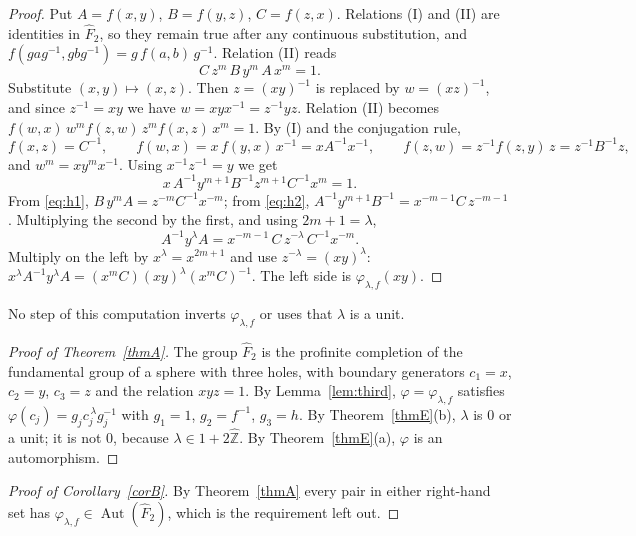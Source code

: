 \documentclass[11pt]{amsart}
\theoremstyle{definition}
\theoremstyle{remark}
\newcommand{\Zh}{\widehat{\mathbb Z}}
\newcommand{\Fh}{\widehat F}
\newcommand{\Aut}{\operatorname{Aut}}
\newcommand{\ph}{\varphi}
\begin{document}
\begin{proof}
Put $A=f(x,y)$, $B=f(y,z)$, $C=f(z,x)$. Relations (I) and (II) are identities in $\Fh_2$, so they remain true after any continuous substitution, and $f(gag^{-1},gbg^{-1})=g\,f(a,b)\,g^{-1}$. Relation (II) reads
\begin{equation}\label{eq:h1}
 C\,z^{m}\,B\,y^{m}\,A\,x^{m}=1 .
\end{equation}
Substitute $(x,y)\mapsto(x,z)$. Then $z=(xy)^{-1}$ is replaced by $w=(xz)^{-1}$, and since $z^{-1}=xy$ we have $w=xyx^{-1}=z^{-1}yz$. Relation (II) becomes $f(w,x)\,w^{m}f(z,w)\,z^{m}f(x,z)\,x^{m}=1$. By (I) and the conjugation rule,
\[
 f(x,z)=C^{-1},\qquad f(w,x)=x\,f(y,x)\,x^{-1}=xA^{-1}x^{-1},\qquad f(z,w)=z^{-1}f(z,y)\,z=z^{-1}B^{-1}z ,
\]
and $w^{m}=xy^{m}x^{-1}$. Using $x^{-1}z^{-1}=y$ we get
\begin{equation}\label{eq:h2}
 x\,A^{-1}y^{m+1}B^{-1}z^{m+1}C^{-1}x^{m}=1 .
\end{equation}
From \eqref{eq:h1}, $B\,y^{m}A=z^{-m}C^{-1}x^{-m}$; from \eqref{eq:h2}, $A^{-1}y^{m+1}B^{-1}=x^{-m-1}C\,z^{-m-1}$. Multiplying the second by the first, and using $2m+1=\lambda$,
\[
 A^{-1}y^{\lambda}A=x^{-m-1}\,C\,z^{-\lambda}\,C^{-1}x^{-m}.
\]
Multiply on the left by $x^{\lambda}=x^{2m+1}$ and use $z^{-\lambda}=(xy)^{\lambda}$:
$x^{\lambda}A^{-1}y^{\lambda}A=(x^{m}C)(xy)^{\lambda}(x^{m}C)^{-1}$. The left side is $\ph_{\lambda,f}(xy)$.
\end{proof}

No step of this computation inverts $\ph_{\lambda,f}$ or uses that $\lambda$ is a unit.

\begin{proof}[Proof of Theorem~\ref{thmA}]
The group $\Fh_2$ is the profinite completion of the fundamental group of a sphere with three holes, with boundary generators $c_1=x$, $c_2=y$, $c_3=z$ and the relation $xyz=1$. By Lemma~\ref{lem:third}, $\ph=\ph_{\lambda,f}$ satisfies $\ph(c_j)=g_jc_j^{\,\lambda}g_j^{-1}$ with $g_1=1$, $g_2=f^{-1}$, $g_3=h$. By Theorem~\ref{thmE}(b), $\lambda$ is $0$ or a unit; it is not $0$, because $\lambda\in1+2\Zh$. By Theorem~\ref{thmE}(a), $\ph$ is an automorphism.
\end{proof}

\begin{proof}[Proof of Corollary~\ref{corB}]
By Theorem~\ref{thmA} every pair in either right-hand set has $\ph_{\lambda,f}\in\Aut(\Fh_2)$, which is the requirement left out.
\end{proof}
\end{document}
